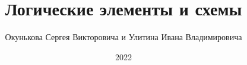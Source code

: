 \documentclass[spec, och, labwork]{shiza}
\begin{document}
\chair{}

\title{Логические элементы и схемы}






\author{Окунькова Сергея Викторовича и Улитина Ивана Владимировича}








\date{2022}

\maketitle

\end{document}
